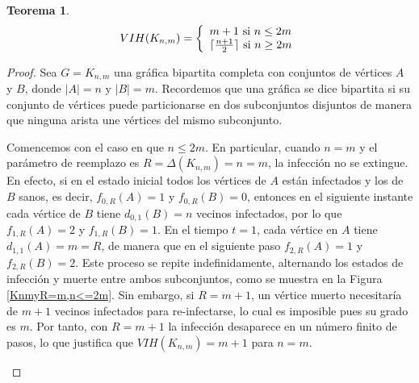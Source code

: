 \documentclass[12pt,titlepage,twoside,openright]{book}
\newtheorem{theorem}{Teorema}[section]
\begin{document}
\begin{theorem}\label{Teo:VIH(Kn,m)}
    $$
    VIH(K_{n,m}) = \left\lbrace
    \begin{array}{ll}
        m+1 \textup{ si } n \leq 2m\\
        \lceil \frac{n+1}{2} \rceil \textup{ si } n \geq 2m
    \end{array}
    \right.
    $$
\end{theorem}
\begin{proof}
    Sea $G = K_{n,m}$ una gr\'afica bipartita completa con conjuntos de v\'ertices $A$ y $B$, donde $|A| = n$ y $|B| = m$. Recordemos que una gr\'afica se dice bipartita si su conjunto de v\'ertices puede particionarse en dos subconjuntos disjuntos de manera que ninguna arista une v\'ertices del mismo subconjunto. 

    Comencemos con el caso en que $n \leq 2m$. En particular, cuando $n = m$ y el par\'ametro de reemplazo es $R = \Delta(K_{n,m}) = n = m$, la infecci\'on no se extingue. En efecto, si en el estado inicial todos los v\'ertices de $A$ est\'an infectados y los de $B$ sanos, es decir, $f_{0,R}(A)=1$ y $f_{0,R}(B)=0$, entonces en el siguiente instante cada v\'ertice de $B$ tiene $d_{0,1}(B)=n$ vecinos infectados, por lo que $f_{1,R}(A)=2$ y $f_{1,R}(B)=1$. En el tiempo $t=1$, cada v\'ertice en $A$ tiene $d_{1,1}(A)=m=R$, de manera que en el siguiente paso $f_{2,R}(A)=1$ y $f_{2,R}(B)=2$. Este proceso se repite indefinidamente, alternando los estados de infecci\'on y muerte entre ambos subconjuntos, como se muestra en la Figura \ref{KnmyR=m,n<=2m}. Sin embargo, si $R = m+1$, un v\'ertice muerto necesitar\'ia de $m+1$ vecinos infectados para re-infectarse, lo cual es imposible pues su grado es $m$. Por tanto, con $R=m+1$ la infecci\'on desaparece en un n\'umero finito de pasos, lo que justifica que $VIH(K_{n,m})=m+1$ para $n=m$.

    \begin{figure}[h]
    \centering
\end{figure}
\end{proof}
\end{document}
